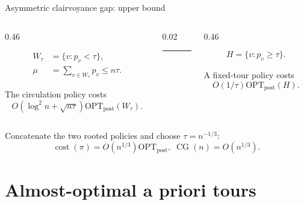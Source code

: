 \documentclass[aspectratio=169,12pt]{beamer}
\newcommand{\OPT}{\mathrm{OPT}}
\newcommand{\optpost}{\OPT_{\mathrm{post}}}
\newcommand{\cost}{\operatorname{cost}}
\begin{document}
\begin{frame}{Asymmetric clairvoyance gap: upper bound}
  \begin{columns}[T,onlytextwidth]
    \begin{column}{0.46\textwidth}
      \small
      \par
      \begin{minipage}[t][1.80cm][t]{\linewidth}
        \[
          \begin{aligned}
            W_\tau&=\{v:p_v<\tau\},\\
            \mu&=\sum_{v\in W_\tau}p_v\le n\tau.
          \end{aligned}
        \]
      \end{minipage}\par
      The circulation policy costs
      \[
        O\!\left(\log^2 n+\sqrt{n\tau}\right)\optpost(W_\tau).
      \]
    \end{column}
    \begin{column}{0.02\textwidth}
      \centering
      {\color{ThMuted!70}\rule{0.8pt}{3.65cm}}
    \end{column}
    \begin{column}{0.46\textwidth}
      \small
      \par
      \begin{minipage}[t][1.80cm][t]{\linewidth}
        \[
          H=\{v:p_v\ge\tau\}.
        \]
      \end{minipage}\par
      A fixed-tour policy costs
      \[
        O(1/\tau)\optpost(H).
      \]
    \end{column}
  \end{columns}

  \bigskip
  Concatenate the two rooted policies and choose \(\tau=n^{-1/3}\):
  \[
    \cost(\pi)=O(n^{1/3})\optpost,
    \;
    \operatorname{CG}(n)=O(n^{1/3}).
  \]
\end{frame}

\section{Almost-optimal a priori tours}
\end{document}
